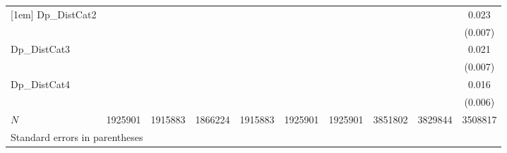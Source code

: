 \begin{table}[htbp]
\begin{tabular}{l*{9}{c}}
[1em]
Dp\_DistCat2 &       &       &       &       &       &       &       &       &  0.023\\
            &       &       &       &       &       &       &       &       &(0.007)\\
[1em]
Dp\_DistCat3 &       &       &       &       &       &       &       &       &  0.021\\
            &       &       &       &       &       &       &       &       &(0.007)\\
[1em]
Dp\_DistCat4 &       &       &       &       &       &       &       &       &  0.016\\
            &       &       &       &       &       &       &       &       &(0.006)\\
\hline
\(N\)       &1925901&1915883&1866224&1915883&1925901&1925901&3851802&3829844&3508817\\
\hline\hline
\multicolumn{10}{l}{\footnotesize Standard errors in parentheses}\\
\end{tabular}
\end{table}
